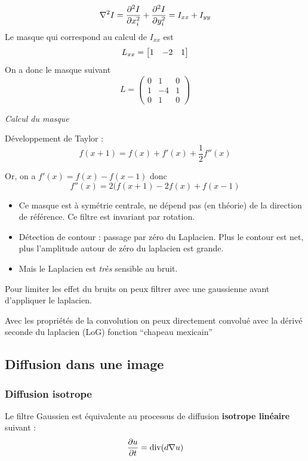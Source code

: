 \documentclass[main.tex]{subfiles}
\begin{document}
\begin{prop}
\[ \nabla^2 I = \derivpp[I]{x_i} + \derivpp[I]{y_i} = I_{xx} + I_{yy} \]
Le masque qui correspond au calcul de $I_{xx}$ est
\[ L_{xx} = \vect{ 1 & -2 & 1} \]
On a donc le masque suivant
\[ L =
  \begin{pmatrix}
  0 & 1 & 0\\
  1 & -4 & 1\\
  0 & 1 & 0
\end{pmatrix}
\]
\end{prop}
\emph{Calcul du masque}

Développement de Taylor :
\[f(x+1) = f(x) + f'(x) + \frac{1}{2}f''(x)\]

Or, on a $f'(x)=f(x)-f(x-1)$ donc
\[ f''(x) = 2(f(x+1)-2f(x)+f(x-1) \]

\begin{rem}
  \begin{itemize}
  \item Ce masque est à symétrie centrale, ne dépend pas (en théorie) de la direction de référence.  Ce filtre est invariant par rotation.
  \item Détection de contour : passage par zéro du Laplacien. Plus le contour est net, plus l'amplitude autour de zéro du laplacien est grande.
  \item Mais le Laplacien est \emph{très} sensible au bruit.
\end{itemize}
\begin{prop}
  Pour limiter les effet du bruits on peux filtrer avec une gaussienne avant d'appliquer le laplacien.

  Avec les propriétés de la convolution on peux directement convolué avec la dérivé seconde du laplacien (LoG) fonction ``chapeau mexicain''
\end{prop}


\end{rem}

\subsection{Diffusion dans une image}

\subsubsection{Diffusion isotrope}
Le filtre Gaussien est équivalente au processus de diffusion \textbf{isotrope linéaire} suivant :
\[ \derivp[u]{t}=\divv (d\nabla u) \]
\end{document}
